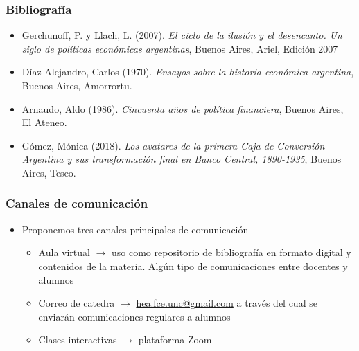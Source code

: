 \documentclass[14pt,aspectratio=169]{beamer}
\begin{document}
  \begin{frame}\frametitle{Bibliografía}
     \begin{itemize}
     \item Gerchunoff, P. y Llach, L. (2007). \textit{El ciclo de la
         ilusión y el desencanto. Un siglo de políticas económicas
         argentinas}, Buenos Aires, Ariel, Edición 2007
       \item Díaz Alejandro, Carlos (1970). \textit{Ensayos sobre la
           historia económica argentina}, Buenos Aires, Amorrortu.
                \item Arnaudo, Aldo (1986). \textit{Cincuenta años de
               política financiera}, Buenos Aires, El Ateneo.
             \item Gómez, Mónica (2018). \textit{Los avatares de la
                 primera Caja de Conversión Argentina y sus
                 transformación final en Banco Central, 1890-1935},
               Buenos Aires, Teseo. 
       \end{itemize}
  \end{frame}

  

\begin{frame}\frametitle{Canales de comunicación}
     \begin{itemize}
     \item Proponemos tres canales principales de comunicación
       \begin{itemize}\itemsep 10pt \medskip
       \item Aula virtual $\longrightarrow$ uso como repositorio de
         bibliografía en formato digital y contenidos de la
         materia. Algún tipo de comunicaciones entre docentes y
         alumnos
         \item Correo de catedra $\longrightarrow$
           \url{hea.fce.unc@gmail.com} a través del cual se enviarán
           comunicaciones regulares a alumnos
           \item Clases interactivas $\longrightarrow$ plataforma Zoom
         \end{itemize}
       \end{itemize}
  \end{frame}
\end{document}
